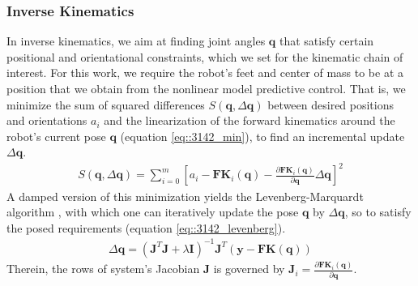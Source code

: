 \subsubsection{Inverse Kinematics}
\label{sec::3142_ik}
In inverse kinematics, we aim at finding joint angles $\bm{q}$ that satisfy certain positional and orientational constraints, which we set for the kinematic chain of interest. For this work, we require the robot's feet and center of mass to be at a position that we obtain from the nonlinear model predictive control. That is, we minimize the sum of squared differences $S(\bm{q},\Delta\bm{q})$ between desired positions and orientations $a_i$ and the linearization of the forward kinematics around the robot's current pose $\bm{q}$ (equation \ref{eq::3142_min}), to find an incremental update $\Delta\bm{q}$. 
\begin{align}
	S(\bm{q},\Delta\bm{q}) = \sum_{i=0}^m\left[a_i-\textbf{FK}_i(\bm{q})-\frac{\partial\textbf{FK}_i(\bm{q})}{\partial\bm{q}}\Delta\bm{q}\right]^2
	\label{eq::3142_min}
\end{align}
A damped version of this minimization yields the Levenberg-Marquardt algorithm \cite{more1978levenberg}, with which one can iteratively update the pose $\bm{q}$ by $\Delta\bm{q}$, so to satisfy the posed requirements (equation \ref{eq::3142_levenberg}).
\begin{align}
	\Delta\bm{q} = (\bm{J}^T\bm{J}+\lambda\bm{I})^{-1}\bm{J}^T(\bm{y}-\textbf{FK}(\bm{q}))
	\label{eq::3142_levenberg}
\end{align}
Therein, the rows of system's Jacobian $\bm{J}$ is governed by $\bm{J}_i=\frac{\partial\textbf{FK}_i(\bm{q})}{\partial\bm{q}}$.